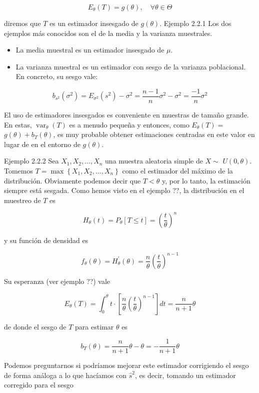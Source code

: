 \documentclass[
]{article}
\providecommand{\tightlist}{%
  \setlength{\itemsep}{0pt}\setlength{\parskip}{0pt}}
\begin{document}
\[
E_{\theta}(T)=g(\theta), \quad \forall \theta \in \Theta
\]

diremos que \(T\) es un estimador insesgado de \(g(\theta)\).
Ejemplo 2.2.1 Los dos ejemplos más conocidos son el de la media y la varianza muestrales.

\begin{itemize}
\tightlist
\item
  La media muestral es un estimador insesgado de \(\mu\).
\item
  La varianza muestral es un estimador con sesgo de la varianza poblacional. En concreto, su sesgo vale:
\end{itemize}

\[
b_{s^{2}}\left(\sigma^{2}\right)=E_{\sigma^{2}}\left(s^{2}\right)-\sigma^{2}=\frac{n-1}{n} \sigma^{2}-\sigma^{2}=\frac{-1}{n} \sigma^{2}
\]

El uso de estimadores insesgados es conveniente en muestras de tamaño grande. En estas, \(\operatorname{var}_{\theta}(T)\) es a menudo pequeña y entonces, como \(E_{\theta}(T)=\) \(g(\theta)+b_{T}(\theta)\), es muy probable obtener estimaciones centradas en este valor en lugar de en el entorno de \(g(\theta)\).

Ejemplo 2.2.2 Sea \(X_{1}, X_{2}, \ldots, X_{n}\) una muestra aleatoria simple de \(X \sim\) \(U(0, \theta)\). Tomemos \(T=\max \left\{X_{1}, X_{2}, \ldots, X_{n}\right\}\) como el estimador del máximo de la distribución. Obviamente podemos decir que \(T<\theta\) y, por lo tanto,
la estimación siempre está sesgada. Como hemos visto en el ejemplo ??, la distribución en el muestreo de \(T\) es

\[
H_{\theta}(t)=P_{\theta}[T \leq t]=\left(\frac{t}{\theta}\right)^{n}
\]

y su función de densidad es

\[
f_{\theta}(\theta)=H_{\theta}^{\prime}(\theta)=\frac{n}{\theta}\left(\frac{t}{\theta}\right)^{n-1}
\]

Su esperanza (ver ejemplo ??) vale

\[
E_{\theta}(T)=\int_{0}^{\theta} t \cdot\left[\frac{n}{\theta}\left(\frac{t}{\theta}\right)^{n-1}\right] d t=\frac{n}{n+1} \theta
\]

de donde el sesgo de \(T\) para estimar \(\theta\) es

\[
b_{T}(\theta)=\frac{n}{n+1} \theta-\theta=-\frac{1}{n+1} \theta
\]

Podemos preguntarnos si podríamos mejorar este estimador corrigiendo el sesgo de forma análoga a lo que hacíamos con \(\hat{s}^{2}\), es decir, tomando un estimador corregido para el sesgo
\end{document}
